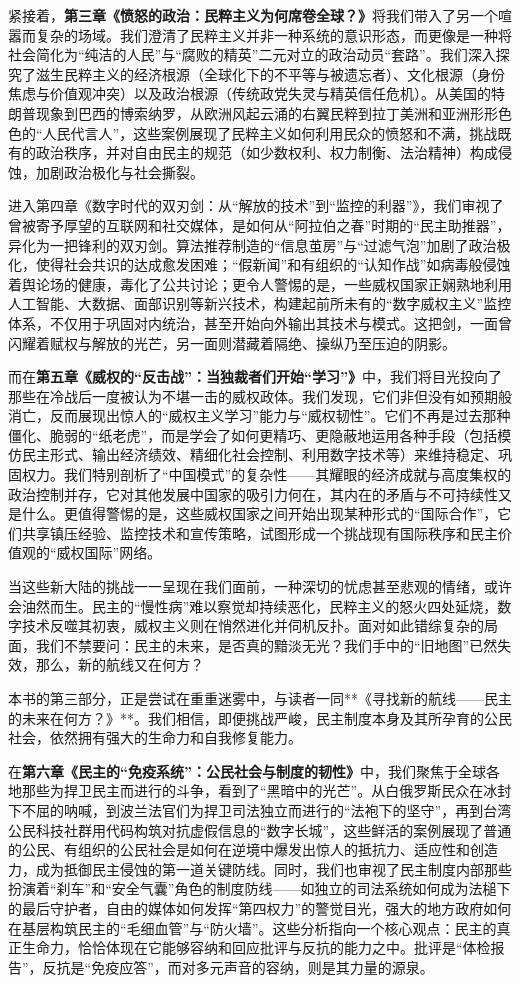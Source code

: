 \documentclass[UTF8, 10pt]{ctexbook}
\begin{document}
紧接着，\textbf{第三章《愤怒的政治：民粹主义为何席卷全球？》}将我们带入了另一个喧嚣而复杂的场域。我们澄清了民粹主义并非一种系统的意识形态，而更像是一种将社会简化为“纯洁的人民”与“腐败的精英”二元对立的政治动员“套路”。我们深入探究了滋生民粹主义的经济根源（全球化下的不平等与被遗忘者）、文化根源（身份焦虑与价值观冲突）以及政治根源（传统政党失灵与精英信任危机）。从美国的特朗普现象到巴西的博索纳罗，从欧洲风起云涌的右翼民粹到拉丁美洲和亚洲形形色色的“人民代言人”，这些案例展现了民粹主义如何利用民众的愤怒和不满，挑战既有的政治秩序，并对自由民主的规范（如少数权利、权力制衡、法治精神）构成侵蚀，加剧政治极化与社会撕裂。

进入第四章《数字时代的双刃剑：从“解放的技术”到“监控的利器”》，我们审视了曾被寄予厚望的互联网和社交媒体，是如何从“阿拉伯之春”时期的“民主助推器”，异化为一把锋利的双刃剑。算法推荐制造的“信息茧房”与“过滤气泡”加剧了政治极化，使得社会共识的达成愈发困难；“假新闻”和有组织的“认知作战”如病毒般侵蚀着舆论场的健康，毒化了公共讨论；更令人警惕的是，一些威权国家正娴熟地利用人工智能、大数据、面部识别等新兴技术，构建起前所未有的“数字威权主义”监控体系，不仅用于巩固对内统治，甚至开始向外输出其技术与模式。这把剑，一面曾闪耀着赋权与解放的光芒，另一面则潜藏着隔绝、操纵乃至压迫的阴影。

而在\textbf{第五章《威权的“反击战”：当独裁者们开始“学习”》}中，我们将目光投向了那些在冷战后一度被认为不堪一击的威权政体。我们发现，它们非但没有如预期般消亡，反而展现出惊人的“威权主义学习”能力与“威权韧性”。它们不再是过去那种僵化、脆弱的“纸老虎”，而是学会了如何更精巧、更隐蔽地运用各种手段（包括模仿民主形式、输出经济绩效、精细化社会控制、利用数字技术等）来维持稳定、巩固权力。我们特别剖析了“中国模式”的复杂性——其耀眼的经济成就与高度集权的政治控制并存，它对其他发展中国家的吸引力何在，其内在的矛盾与不可持续性又是什么。更值得警惕的是，这些威权国家之间开始出现某种形式的“国际合作”，它们共享镇压经验、监控技术和宣传策略，试图形成一个挑战现有国际秩序和民主价值观的“威权国际”网络。

当这些新大陆的挑战一一呈现在我们面前，一种深切的忧虑甚至悲观的情绪，或许会油然而生。民主的“慢性病”难以察觉却持续恶化，民粹主义的怒火四处延烧，数字技术反噬其初衷，威权主义则在悄然进化并伺机反扑。面对如此错综复杂的局面，我们不禁要问：民主的未来，是否真的黯淡无光？我们手中的“旧地图”已然失效，那么，新的航线又在何方？

本书的第三部分，正是尝试在重重迷雾中，与读者一同**《寻找新的航线——民主的未来在何方？》**。我们相信，即便挑战严峻，民主制度本身及其所孕育的公民社会，依然拥有强大的生命力和自我修复能力。

在\textbf{第六章《民主的“免疫系统”：公民社会与制度的韧性》}中，我们聚焦于全球各地那些为捍卫民主而进行的斗争，看到了“黑暗中的光芒”。从白俄罗斯民众在冰封下不屈的呐喊，到波兰法官们为捍卫司法独立而进行的“法袍下的坚守”，再到台湾公民科技社群用代码构筑对抗虚假信息的“数字长城”，这些鲜活的案例展现了普通的公民、有组织的公民社会是如何在逆境中爆发出惊人的抵抗力、适应性和创造力，成为抵御民主侵蚀的第一道关键防线。同时，我们也审视了民主制度内部那些扮演着“刹车”和“安全气囊”角色的制度防线——如独立的司法系统如何成为法槌下的最后守护者，自由的媒体如何发挥“第四权力”的警觉目光，强大的地方政府如何在基层构筑民主的“毛细血管”与“防火墙”。这些分析指向一个核心观点：民主的真正生命力，恰恰体现在它能够容纳和回应批评与反抗的能力之中。批评是“体检报告”，反抗是“免疫应答”，而对多元声音的容纳，则是其力量的源泉。
\end{document}
